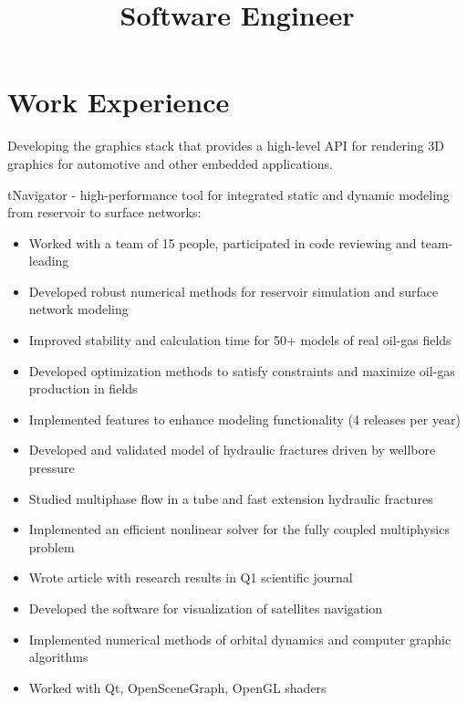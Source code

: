 \documentclass[10pt,a4paper]{moderncv}
\title{Software Engineer}
\begin{document}
\maketitle

\section{Work Experience}

{
}

{
Developing the graphics stack that provides a high-level API for rendering 3D graphics for automotive and other embedded applications.
}

{tNavigator - high-performance tool for integrated static and dynamic modeling from reservoir to surface networks:
  \begin{itemize}
  \item Worked with a team of 15 people, participated in code reviewing and team-leading
  \item Developed robust numerical methods for reservoir simulation and surface network modeling
  \item Improved stability and calculation time for 50+ models of real oil-gas fields
  \item Developed optimization methods to satisfy constraints and maximize oil-gas production in fields
  \item Implemented features to enhance modeling functionality (4 releases per year)
  \end{itemize}
}

{
\begin{itemize}
 \item Developed and validated model of hydraulic fractures driven by wellbore pressure
 \item Studied multiphase flow in a tube and fast extension hydraulic fractures 
 \item Implemented an efficient nonlinear solver for the fully coupled multiphysics problem
 \item Wrote article with research results in Q1 scientific journal 
\end{itemize}
}

{
\begin{itemize}
 \item Developed the software for visualization of satellites navigation
 \item Implemented numerical methods of orbital dynamics and computer graphic algorithms
 \item Worked with Qt, OpenSceneGraph, OpenGL shaders
\end{itemize}
}
\end{document}
